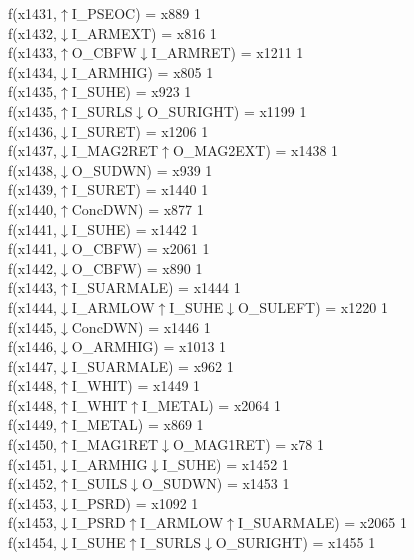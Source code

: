 f(x1431,$\uparrow$I\_PSEOC) = x889 {1} \\
f(x1432,$\downarrow$I\_ARMEXT) = x816 {1} \\
f(x1433,$\uparrow$O\_CBFW$\downarrow$I\_ARMRET) = x1211 {1} \\
f(x1434,$\downarrow$I\_ARMHIG) = x805 {1} \\
f(x1435,$\uparrow$I\_SUHE) = x923 {1} \\
f(x1435,$\uparrow$I\_SURLS$\downarrow$O\_SURIGHT) = x1199 {1} \\
f(x1436,$\downarrow$I\_SURET) = x1206 {1} \\
f(x1437,$\downarrow$I\_MAG2RET$\uparrow$O\_MAG2EXT) = x1438 {1} \\
f(x1438,$\downarrow$O\_SUDWN) = x939 {1} \\
f(x1439,$\uparrow$I\_SURET) = x1440 {1} \\
f(x1440,$\uparrow$ConcDWN) = x877 {1} \\
f(x1441,$\downarrow$I\_SUHE) = x1442 {1} \\
f(x1441,$\downarrow$O\_CBFW) = x2061 {1} \\
f(x1442,$\downarrow$O\_CBFW) = x890 {1} \\
f(x1443,$\uparrow$I\_SUARMALE) = x1444 {1} \\
f(x1444,$\downarrow$I\_ARMLOW$\uparrow$I\_SUHE$\downarrow$O\_SULEFT) = x1220 {1} \\
f(x1445,$\downarrow$ConcDWN) = x1446 {1} \\
f(x1446,$\downarrow$O\_ARMHIG) = x1013 {1} \\
f(x1447,$\downarrow$I\_SUARMALE) = x962 {1} \\
f(x1448,$\uparrow$I\_WHIT) = x1449 {1} \\
f(x1448,$\uparrow$I\_WHIT$\uparrow$I\_METAL) = x2064 {1} \\
f(x1449,$\uparrow$I\_METAL) = x869 {1} \\
f(x1450,$\uparrow$I\_MAG1RET$\downarrow$O\_MAG1RET) = x78 {1} \\
f(x1451,$\downarrow$I\_ARMHIG$\downarrow$I\_SUHE) = x1452 {1} \\
f(x1452,$\uparrow$I\_SUILS$\downarrow$O\_SUDWN) = x1453 {1} \\
f(x1453,$\downarrow$I\_PSRD) = x1092 {1} \\
f(x1453,$\downarrow$I\_PSRD$\uparrow$I\_ARMLOW$\uparrow$I\_SUARMALE) = x2065 {1} \\
f(x1454,$\downarrow$I\_SUHE$\uparrow$I\_SURLS$\downarrow$O\_SURIGHT) = x1455 {1} \\
